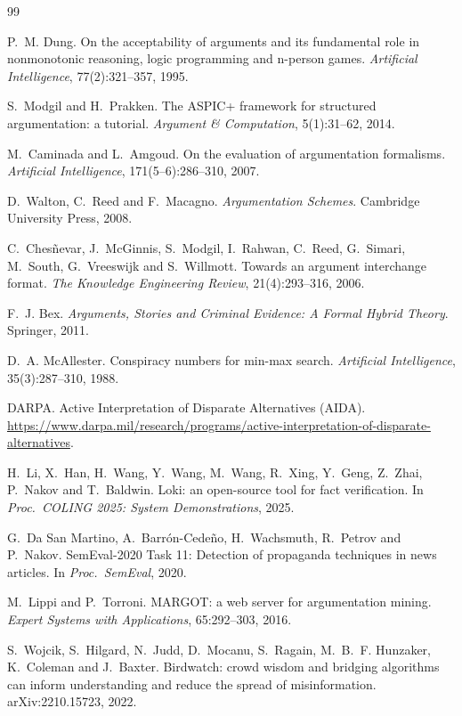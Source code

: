 \documentclass[11pt]{article}
\begin{document}
\begin{thebibliography}{99}\small

P.~M. Dung.
On the acceptability of arguments and its fundamental role in
nonmonotonic reasoning, logic programming and n-person games.
\emph{Artificial Intelligence}, 77(2):321--357, 1995.

S.~Modgil and H.~Prakken.
The ASPIC+ framework for structured argumentation: a tutorial.
\emph{Argument \& Computation}, 5(1):31--62, 2014.

M.~Caminada and L.~Amgoud.
On the evaluation of argumentation formalisms.
\emph{Artificial Intelligence}, 171(5--6):286--310, 2007.

D.~Walton, C.~Reed and F.~Macagno.
\emph{Argumentation Schemes}.
Cambridge University Press, 2008.

C.~Ches\~nevar, J.~McGinnis, S.~Modgil, I.~Rahwan, C.~Reed, G.~Simari,
M.~South, G.~Vreeswijk and S.~Willmott.
Towards an argument interchange format.
\emph{The Knowledge Engineering Review}, 21(4):293--316, 2006.

F.~J. Bex.
\emph{Arguments, Stories and Criminal Evidence: A Formal Hybrid Theory}.
Springer, 2011.

D.~A. McAllester.
Conspiracy numbers for min-max search.
\emph{Artificial Intelligence}, 35(3):287--310, 1988.

DARPA.
Active Interpretation of Disparate Alternatives (AIDA).
\url{https://www.darpa.mil/research/programs/active-interpretation-of-disparate-alternatives}.

H.~Li, X.~Han, H.~Wang, Y.~Wang, M.~Wang, R.~Xing, Y.~Geng, Z.~Zhai,
P.~Nakov and T.~Baldwin.
Loki: an open-source tool for fact verification.
In \emph{Proc.\ COLING 2025: System Demonstrations}, 2025.

G.~Da San Martino, A.~Barr\'on-Cede\~no, H.~Wachsmuth, R.~Petrov and
P.~Nakov.
SemEval-2020 Task 11: Detection of propaganda techniques in news
articles.
In \emph{Proc.\ SemEval}, 2020.

M.~Lippi and P.~Torroni.
MARGOT: a web server for argumentation mining.
\emph{Expert Systems with Applications}, 65:292--303, 2016.

S.~Wojcik, S.~Hilgard, N.~Judd, D.~Mocanu, S.~Ragain, M.~B.~F. Hunzaker,
K.~Coleman and J.~Baxter.
Birdwatch: crowd wisdom and bridging algorithms can inform understanding
and reduce the spread of misinformation.
arXiv:2210.15723, 2022.


\end{thebibliography}
\end{document}
